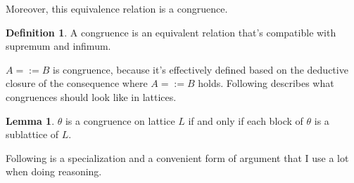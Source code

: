 \documentclass{article}
\theoremstyle{definition}
\newtheorem{lemma}{Lemma}
\newtheorem{definition}{Definition}
\begin{document}
Moreover, this equivalence relation is a congruence.

\begin{definition}
  \cite[6.5]{lattice} A congruence is an equivalent relation that's compatible with
  supremum and infimum.
\end{definition}

$A =:= B$ is congruence, because it's effectively defined based on the deductive
closure of the consequence where $A =:= B$ holds. Following describes what congruences
should look like in lattices.

\begin{lemma}
  \cite[6.14]{lattice} \label{lem:sublattice} $\theta$ is a congruence on lattice $L$
  if and only if each block of $\theta$ is a sublattice of $L$.
\end{lemma}

Following is a specialization and a convenient form of argument that I use a lot when
doing reasoning.
\end{document}
